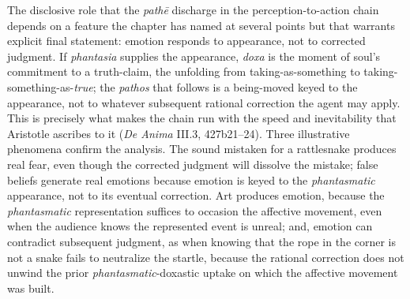 \documentclass{article}
\begin{document}
The disclosive role that the \textit{pathē} discharge in the perception-to-action chain depends on a feature the chapter has named at several points but that warrants explicit final statement: emotion responds to appearance, not to corrected judgment. If \textit{phantasia} supplies the appearance, \textit{doxa} is the moment of \textitthe soul's commitment to a truth-claim, the unfolding from taking-as-something to taking-something-as-\textit{true}; the \textit{pathos} that follows is a being-moved keyed to the appearance, not to whatever subsequent rational correction the agent may apply. This is precisely what makes the chain run with the speed and inevitability that Aristotle ascribes to it (\textit{De Anima} III.3, 427b21--24). Three illustrative phenomena confirm the analysis. The sound mistaken for a rattlesnake produces real fear, even though the corrected judgment will dissolve the mistake; false beliefs generate real emotions because emotion is keyed to the \textit{phantasmatic} appearance, not to its eventual correction. Art produces emotion, because the \textit{phantasmatic} representation suffices to occasion the affective movement, even when the audience knows the represented event is unreal; and, emotion can contradict subsequent judgment, as when knowing that the rope in the corner is not a snake fails to neutralize the startle, because the rational correction does not unwind the prior \textit{phantasmatic}-doxastic uptake on which the affective movement was built.
\end{document}
